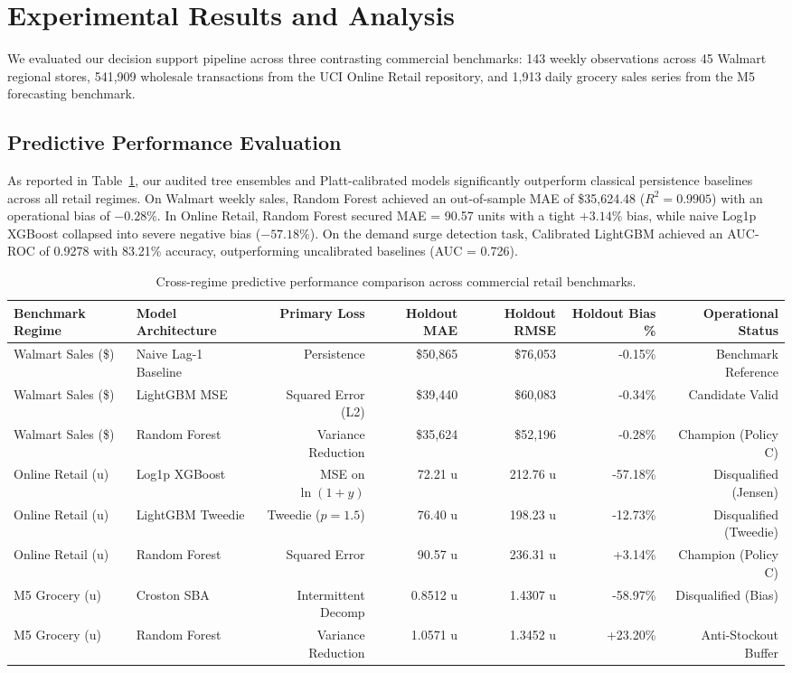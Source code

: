 \documentclass[11pt,a4paper]{article}
\begin{document}
\section{Experimental Results and Analysis}
We evaluated our decision support pipeline across three contrasting commercial benchmarks: 143 weekly observations across 45 Walmart regional stores, 541,909 wholesale transactions from the UCI Online Retail repository, and 1,913 daily grocery sales series from the M5 forecasting benchmark.

\subsection{Predictive Performance Evaluation}
As reported in Table~\ref{tab:predictive}, our audited tree ensembles and Platt-calibrated models significantly outperform classical persistence baselines across all retail regimes. On Walmart weekly sales, Random Forest achieved an out-of-sample MAE of \$35,624.48 ($R^2 = 0.9905$) with an operational bias of $-0.28\%$. In Online Retail, Random Forest secured MAE = 90.57 units with a tight $+3.14\%$ bias, while naive Log1p XGBoost collapsed into severe negative bias ($-57.18\%$). On the demand surge detection task, Calibrated LightGBM achieved an AUC-ROC of 0.9278 with 83.21\% accuracy, outperforming uncalibrated baselines (AUC = 0.726).

\begin{table}[htbp]
\centering
\small
\caption{Cross-regime predictive performance comparison across commercial retail benchmarks.}
\label{tab:predictive}
\begin{tabular}{llrrrrr}
\toprule
\textbf{Benchmark Regime} & \textbf{Model Architecture} & \textbf{Primary Loss} & \textbf{Holdout MAE} & \textbf{Holdout RMSE} & \textbf{Holdout Bias \%} & \textbf{Operational Status} \\
\midrule
Walmart Sales (\$) & Naive Lag-1 Baseline & Persistence & \$50,865 & \$76,053 & -0.15\% & Benchmark Reference \\
Walmart Sales (\$) & LightGBM MSE & Squared Error (L2) & \$39,440 & \$60,083 & -0.34\% & Candidate Valid \\
Walmart Sales (\$) & Random Forest & Variance Reduction & \$35,624 & \$52,196 & -0.28\% & Champion (Policy C) \\
Online Retail (u) & Log1p XGBoost & MSE on $\ln(1+y)$ & 72.21 u & 212.76 u & -57.18\% & Disqualified (Jensen) \\
Online Retail (u) & LightGBM Tweedie & Tweedie ($p=1.5$) & 76.40 u & 198.23 u & -12.73\% & Disqualified (Tweedie) \\
Online Retail (u) & Random Forest & Squared Error & 90.57 u & 236.31 u & +3.14\% & Champion (Policy C) \\
M5 Grocery (u) & Croston SBA & Intermittent Decomp & 0.8512 u & 1.4307 u & -58.97\% & Disqualified (Bias) \\
M5 Grocery (u) & Random Forest & Variance Reduction & 1.0571 u & 1.3452 u & +23.20\% & Anti-Stockout Buffer \\
\bottomrule
\end{tabular}
\end{table}
\end{document}
